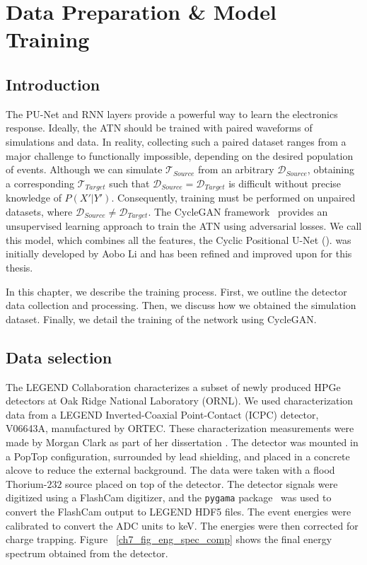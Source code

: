 \chapter{Data Preparation \& Model Training} \label{chap:training}

\section{Introduction}
The PU-Net and RNN layers provide a powerful way to learn the electronics response. Ideally, the ATN should be trained with paired waveforms of simulations and data. In reality, collecting such a paired dataset ranges from a major challenge to functionally impossible, depending on the desired population of events. Although we can simulate $\mathcal{T}_{Source}$ from an arbitrary $\mathcal{D}_{Source}$, obtaining a corresponding $\mathcal{T}_{Target}$ such that $\mathcal{D}_{Source} = \mathcal{D}_{Target}$ is difficult without precise knowledge of $P(X'|Y')$. Consequently, training must be performed on unpaired datasets, where $\mathcal{D}_{Source} \neq \mathcal{D}_{Target}$. The CycleGAN framework~\cite{CycleGAN} provides an unsupervised learning approach to train the ATN using adversarial losses. We call this model, which combines all the features, the Cyclic Positional U-Net ({\cpunet}). {\cpunet} was initially developed by Aobo Li and has been refined and improved upon for this thesis. 

In this chapter, we describe the {\cpunet} training process. First, we outline the detector data collection and processing. Then, we discuss how we obtained the simulation dataset. Finally, we detail the training of the network using CycleGAN.

\section{Data selection}
The LEGEND Collaboration characterizes a subset of newly produced HPGe detectors at Oak Ridge National Laboratory (ORNL). We used characterization data from a LEGEND Inverted-Coaxial Point-Contact (ICPC) detector, V06643A, manufactured by ORTEC. These characterization measurements were made by Morgan Clark as part of her dissertation \cite{clark2023phdthesis}. The detector was mounted in a PopTop configuration, surrounded by lead shielding, and placed in a concrete alcove to reduce the external background. The data were taken with a flood Thorium-$232$ source placed on top of the detector. The detector signals were digitized using a FlashCam digitizer, and the \texttt{pygama} package~\cite{pygama} was used to convert the FlashCam output to LEGEND HDF5 files.  The event energies were calibrated to convert the ADC units to keV. The energies were then corrected for charge trapping. Figure ~\ref{ch7_fig_eng_spec_comp} shows the final energy spectrum obtained from the detector.

